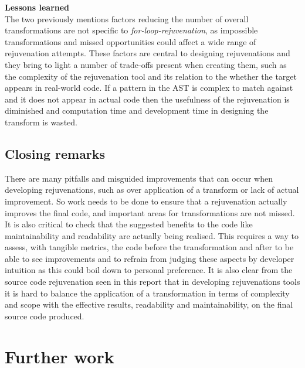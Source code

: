 \documentclass[bsc,frontabs,singlespacing,twoside,parskip,deptreport]{infthesis}
\begin{document}
\textbf{Lessons learned}\\
The two previously mentions factors reducing the number of overall transformations are not specific to \textit{for-loop-rejuvenation}, as impossible transformations and missed opportunities could affect a wide range of rejuvenation attempts. These factors are central to designing rejuvenations and they bring to light a number of trade-offs present when creating them, such as the complexity of the rejuvenation tool and its relation to the whether the target appears in real-world code. If a pattern in the AST is complex to match against and it does not appear in actual code then the usefulness of the rejuvenation is diminished and computation time and development time in designing the transform is wasted. 


\subsection{Closing remarks}

There are many pitfalls and misguided improvements that can occur when developing rejuvenations, such as over application of a transform or lack of actual improvement. So work needs to be done to ensure that a rejuvenation actually improves the final code, and important areas for transformations are not missed. It is also critical to check that the suggested benefits to the code like maintainability and readability are actually being realised. This requires a way to assess, with tangible metrics, the code before the transformation and after to be able to see improvements and to refrain from judging these aspects by developer intuition as this could boil down to personal preference. It is also clear from the source code rejuvenation seen in this report that in developing rejuvenations tools it is hard to balance the application of a transformation in terms of complexity and scope with the effective results, readability and maintainability, on the final source code produced. 


\section{Further work}
\end{document}
